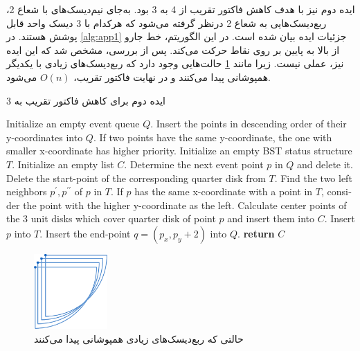 \documentclass[12pt]{article}
\begin{document}
ایده دوم نیز با هدف کاهش فاکتور تقریب از 4 به 3 بود. به‌جای نیم‌دیسک‌های با شعاع 2، ربع‌دیسک‌هایی به شعاع 2 درنظر گرفته می‌شود که هرکدام با 3 دیسک واحد قابل پوشش هستند. در
\cref{alg:app1}
جزئیات ایده بیان شده است. در این الگوریتم، خط جارو از بالا به پایین بر روی نقاط حرکت می‌کند. پس از بررسی، مشخص شد که این ایده نیز، عملی نیست. زیرا مانند
\cref{fig:app2}
حالت‌هایی وجود دارد که ربع‌دیسک‌های زیادی با یکدیگر همپوشانی پیدا می‌کنند و در نهایت فاکتور تقریب، $O(n)$ می‌شود.



\begin{algorithm}[H]
\singlespace
\caption{
ایده دوم برای کاهش فاکتور تقریب به 3 
}
\label{alg:app1}
\begin{latin}
\begin{algorithmic}[1]
\STATE Initialize an empty event queue $Q$. Insert the points in descending order of their y-coordinates into $Q$. If two points have the same y-coordinate, the one with smaller x-coordinate has higher priority.
\STATE Initialize an empty BST status structure $T$.
\STATE Initialize an empty list $C$.
    \STATE Determine the next event point $p$ in $Q$ and delete it.
        \STATE Delete the start-point of the corresponding quarter disk from $T$.
    \ELSE
        \STATE Find the two left neighbors $p^{\prime}, p^{\prime \prime}$ of $p$ in $T$. If $p$ has the same x-coordinate with a point in $T$, consider the point with the higher y-coordinate as the left.
            \STATE Calculate center points of the 3 unit disks which cover quarter disk of point $p$ and insert them into $C$.
            \STATE Insert $p$ into $T$.
            \STATE Insert the end-point $q=(p_x, p_y + 2)$ into $Q$.
        \ENDIF
    \ENDIF
\ENDWHILE
\STATE \textbf{return} $C$
\end{algorithmic}
\end{latin}
\end{algorithm}


\begin{figure}[!h]
\centering
\includegraphics[width=0.25\textwidth]{figs/app2}
\caption{
حالتی که ربع‌دیسک‌های زیادی همپوشانی پیدا می‌کنند
}
\label{fig:app2}
\end{figure}
\end{document}
